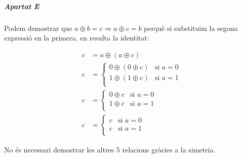 \documentclass[catalan,border=15pt,class=scrartcl,multi=minipage]{standalone}
\begin{document}
\begin{minipage}{30em}
\subparagraph{Apartat E} Podem demostrar que $a \oplus b = c \Rightarrow a \oplus c = b$ perquè si substituim la segona expressió en la primera, en resulta la identitat:

\begin{align*}
  c &= a \oplus \left(a \oplus c\right) \\
  c &= \begin{cases}
    0 \oplus \left(0 \oplus c\right) & \text{si $a = 0$} \\
    1 \oplus \left(1 \oplus c\right) & \text{si $a = 1$} \\
  \end{cases} \\
  c &= \begin{cases}
    0 \oplus c & \text{si $a = 0$} \\
    1 \oplus \overline{c} & \text{si $a = 1$} \\
  \end{cases} \\
  c &= \begin{cases}
    c & \text{si $a = 0$} \\
    c & \text{si $a = 1$} \\
  \end{cases}
\end{align*}

No és necessari demostrar les altres 5 relacions gràcies a la simetria.

\end{minipage}
\end{document}
